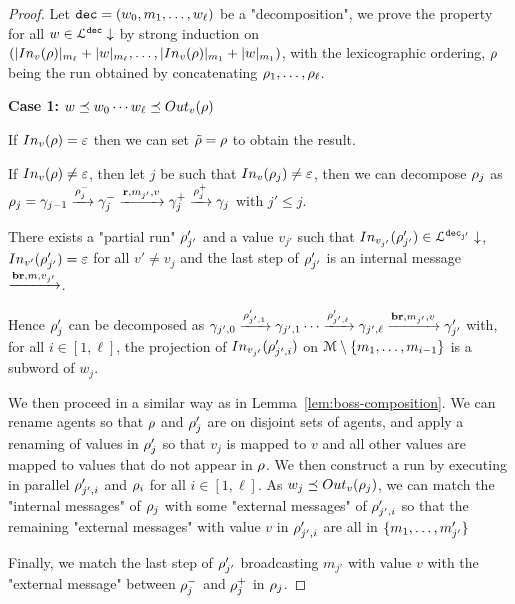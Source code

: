 \begin{proof}
	Let $\mathtt{dec} = (w_0, m_1, \ldots, w_\ell)$ be a "decomposition", we prove the property for all $w \in \mathcal{L}^{\mathtt{\mathtt{dec}}}\downarrow$ by strong induction on $(\size{\vinput{v}{\run}}_{m_\ell} + \size{w}_{m_\ell}, \ldots, \size{\vinput{v}{\run}}_{m_1}+ \size{w}_{m_1})$, with the lexicographic ordering, $\rho$ being the run obtained by concatenating $\rho_1, \ldots, \rho_\ell$.
	
	\textbf{Case 1: $w \subword w_0\cdots w_\ell \subword \voutput{v}{\run}$}
	
	If $\vinput{v}{\run} = \epsilon$ then we can set $\Tilde{\rho} = \rho$ to obtain the result.
	
	If $\vinput{v}{\run} \neq \epsilon$, then let $j$ be such that $\vinput{v}{\run_j} \neq \epsilon$, then we can decompose $\rho_j$ as $\rho_j = \gamma_{j-1} \xrightarrow{\rho_j^-} \gamma_j^- \xrightarrow{\textbf{r}, m_{j'}, v} \gamma_j^+ \xrightarrow{\rho_j^+} \gamma_j$ with $j'\leq j$. 
	
	There exists a "partial run" $\rho'_{j'}$ and a value $v_{j'}$ such that $\vinput{v_{j'}}{\run'_{j'}} \in \langdecdown{\decsymb_{j'}}$,  $\vinput{v'}{\run'_{j'}} = \varepsilon$ for all $v' \neq v_j$  and the last step of $\rho'_{j'}$ is an internal message $\xrightarrow{\textbf{br}, m, v_{j'}}$.
	
	Hence $\rho'_j$ can be decomposed as $\gamma_{{j'},0} \xrightarrow{\rho_{{j'},1}'} \gamma_{{j'},1} \cdots \xrightarrow{\rho_{{j'},\ell}'} \gamma_{{j'},\ell} \xrightarrow{\textbf{br}, m_{j'}, v} \gamma'_{j'}$ with, for all $i \in [1, \ell]$, the projection of $\vinput{v_{j'}}{\run_{{j'},i}'}$ on ${\mathcal{M}\setminus\{m_1, \ldots, m_{{i}-1}\}}$ is a subword of $w_j$.
	
	We then proceed in a similar way as in Lemma~\ref{lem:boss-composition}.
	We can rename agents so that $\rho$ and $\rho'_j$ are on disjoint sets of agents, and apply a renaming of values in $\rho_j'$ so that $v_j$ is mapped to $v$ and all other values are mapped to values that do not appear in $\rho$.
	We then construct a run by executing in parallel $\rho_{j',i}'$ and $\rho_i$ for all $i\in [1,\ell]$. As $w_j \subword \voutput{v}{\run_j}$, we can match the "internal messages" of $\rho_j$ with some "external messages" of $\rho'_{j',i}$ so that the remaining "external messages" with value $v$ in $\rho'_{j',i}$ are all in $\{m_1, \ldots, m'_{j'}\}$
	
	Finally, we match the last step of $\rho'_{j'}$ broadcasting $m_{j'}$ with value $v$ with the "external message" between $\rho_{j}^-$ and $\rho_{j}^+$ in $\rho_j$.
	
	
\end{proof}

